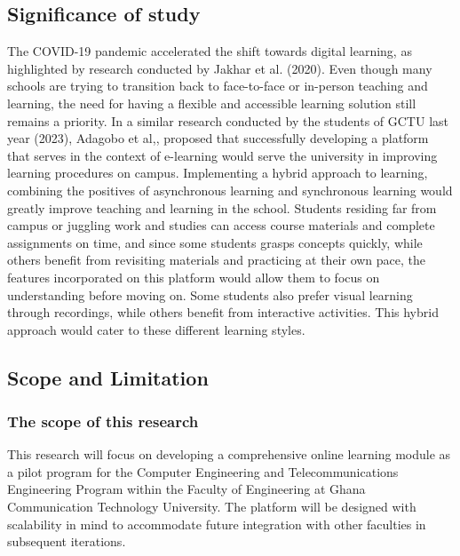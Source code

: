 \documentclass[a4paper,12pt]{article}  %
\begin{document}
\subsection{Significance of study}
The COVID-19 pandemic accelerated the shift towards digital learning, as
highlighted by research conducted by Jakhar et al. (2020). Even though many
schools are trying to transition back to face-to-face or in-person teaching and
learning, the need for having a flexible and accessible learning solution still
remains a priority. In a similar research conducted by the students of GCTU
last year (2023), Adagobo et al,\cite{emmanuel2022design}, proposed that successfully developing a
platform that serves in the context of e-learning would serve the university in
improving learning procedures on campus. Implementing a hybrid approach to
learning, combining the positives of asynchronous learning and synchronous
learning would greatly improve teaching and learning in the school.\cite{islam2015challenges} Students
residing far from campus or juggling work and studies can access course
materials and complete assignments on time, and since some students grasps
concepts quickly, while others benefit from revisiting materials and practicing
at their own pace, the features incorporated on this platform would allow them
to focus on understanding before moving on. Some students also prefer visual
learning through recordings, while others benefit from interactive activities.
This hybrid approach would cater to these different learning styles.\\

\subsection{Scope and Limitation}
\subsubsection{The scope of this research}
This research will focus on developing a comprehensive online learning module
as a pilot program for the Computer Engineering and Telecommunications
Engineering Program within the Faculty of Engineering at Ghana Communication
Technology University. The platform will be designed with scalability in mind
to accommodate future integration with other faculties in subsequent
iterations.\\
\end{document}
